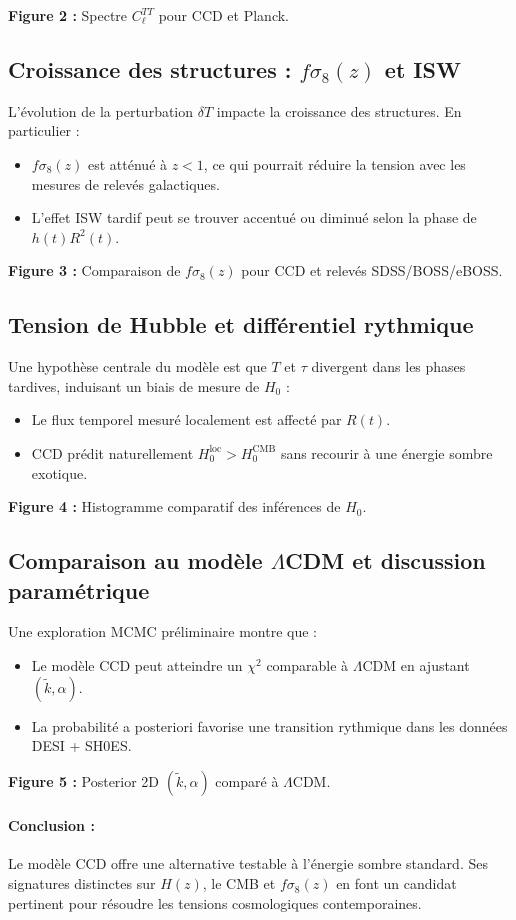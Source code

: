 \textbf{Figure 2 :} Spectre $C_\ell^{TT}$ pour CCD et Planck.

\subsection{Croissance des structures : $f\sigma_8(z)$ et ISW}

L’évolution de la perturbation $\delta T$ impacte la croissance des structures. En particulier :

\begin{itemize}
  \item $f\sigma_8(z)$ est atténué à $z < 1$, ce qui pourrait réduire la tension avec les mesures de relevés galactiques.
  \item L’effet ISW tardif peut se trouver accentué ou diminué selon la phase de $h(t)R^2(t)$.
\end{itemize}

\textbf{Figure 3 :} Comparaison de $f\sigma_8(z)$ pour CCD et relevés SDSS/BOSS/eBOSS.

\subsection{Tension de Hubble et différentiel rythmique}

Une hypothèse centrale du modèle est que $T$ et $\tau$ divergent dans les phases tardives, induisant un biais de mesure de $H_0$ :

\begin{itemize}
  \item Le flux temporel mesuré localement est affecté par $R(t)$.
  \item CCD prédit naturellement $H_0^\text{loc} > H_0^\text{CMB}$ sans recourir à une énergie sombre exotique.
\end{itemize}

\textbf{Figure 4 :} Histogramme comparatif des inférences de $H_0$.

\subsection{Comparaison au modèle $\Lambda$CDM et discussion paramétrique}

Une exploration MCMC préliminaire montre que :

\begin{itemize}
  \item Le modèle CCD peut atteindre un $\chi^2$ comparable à $\Lambda$CDM en ajustant $(\tilde{k}, \alpha)$.
  \item La probabilité a posteriori favorise une transition rythmique dans les données DESI + SH0ES.
\end{itemize}

\textbf{Figure 5 :} Posterior 2D $(\tilde{k}, \alpha)$ comparé à $\Lambda$CDM.

\paragraph{Conclusion :} Le modèle CCD offre une alternative testable à l’énergie sombre standard. Ses signatures distinctes sur $H(z)$, le CMB et $f\sigma_8(z)$ en font un candidat pertinent pour résoudre les tensions cosmologiques contemporaines.
